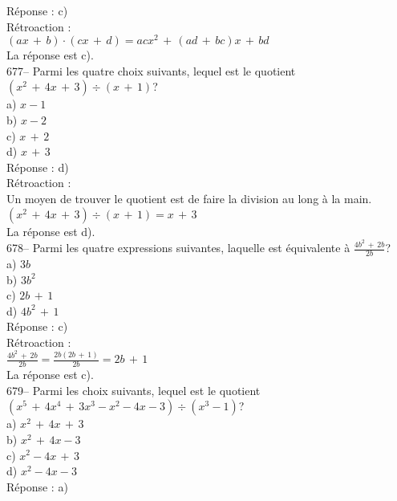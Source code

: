 ﻿\documentclass[letterpaper, 12pt]{article}
\begin{document}
R\'eponse : c)\\

R\'etroaction : \\
$\left( ax\,+\,b\right) \cdot\left( cx\,+\,d\right) =acx^2\,+\,\left(
ad\,+\,bc\right)x \,+\,bd$\\
La r\'eponse est c).\\

677-- Parmi les quatre choix suivants, lequel est le quotient $\left(
x^{2}\,+\,4x\,+\,3\right) \div \left( x\,+\,1\right)$?\\
a) $x-1$\\
b) $x-2$ \\
c) $x\,+\,2$\\
d) $x\,+\,3$\\

R\'eponse : d)\\

R\'etroaction : \\
Un moyen de trouver le quotient est de faire la division au long \`a la
main.\\
$\left( x^{2}\,+\,4x\,+\,3\right) \div \left( x\,+\,1\right)= x\,+\,3$\\
La r\'eponse est d).\\

678-- Parmi les quatre expressions suivantes, laquelle est \'equivalente \`a
$\frac{4b^{2}\,+\,2b}{2b}$?\\
a) $3b$\\
b) $3b^{2}$\\
c) $2b\,+\,1$\\
d) $4b^{2}\,+\,1$\\

R\'eponse : c)\\

R\'etroaction : \\[2mm]
$\frac{4b^{2}\,+\,2b}{2b}=\frac{2b\left(2b\,+\,1 \right)
}{2b}=2b\,+\,1$\\[2mm]
La r\'eponse est c).\\

679-- Parmi les choix suivants, lequel est le quotient $\left(
x^{5}\,+\,4x^{4}\,+\,3x^{3}-x^{2}-4x-3\right) \div\left( x^{3}-1\right) $?\\
a) $x^{2}\,+\,4x\,+\,3$\\
b) $x^{2}\,+\,4x-3$\\
c) $x^{2}-4x\,+\,3$\\
d) $x^{2}-4x-3$\\

R\'eponse : a)\\
\end{document}
